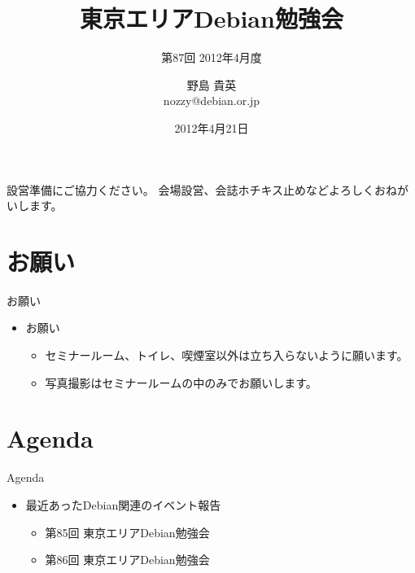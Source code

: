 \title{東京エリアDebian勉強会}
\subtitle{第87回 2012年4月度}
\author{野島 貴英\\nozzy@debian.or.jp}
\date{2012年4月21日}



\frame{\titlepage{}}

\begin{frame}{設営準備にご協力ください。}
会場設営、会誌ホチキス止めなどよろしくおねがいします。
\end{frame}

\section{お願い}
\begin{frame}{お願い}
\begin{itemize}
\item お願い
  \begin{itemize}
  \item セミナールーム、トイレ、喫煙室以外は立ち入らないように願います。
  \item 写真撮影はセミナールームの中のみでお願いします。
  \end{itemize}
\end{itemize}
\end{frame}

\section{Agenda}
\begin{frame}{Agenda}
  \begin{itemize}
  \item 最近あったDebian関連のイベント報告
    \begin{itemize}
    \item 第85回 東京エリアDebian勉強会
    \item 第86回 東京エリアDebian勉強会
    \end{itemize}
  \end{itemize}
\end{frame}

